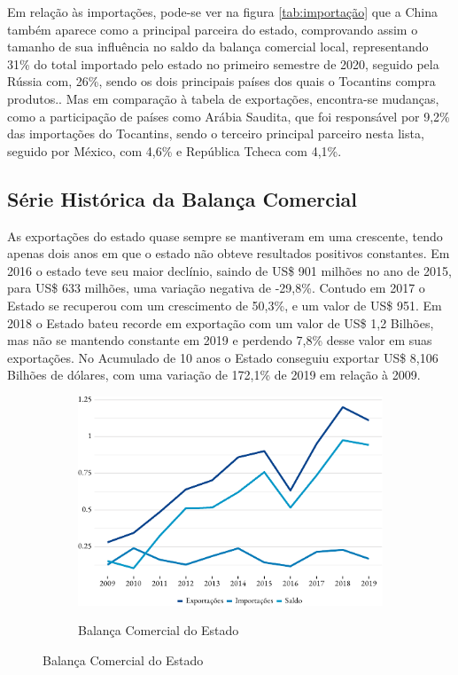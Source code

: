 \par Em relação às importações, pode-se ver na figura \ref{tab:importação} que a China também aparece como a principal parceira do estado, comprovando assim o tamanho de sua influência no saldo da balança comercial local, representando 31\% do total importado pelo estado no primeiro semestre de 2020, seguido pela Rússia com, 26\%, sendo os dois principais países dos quais o Tocantins compra produtos.. Mas em comparação à tabela de exportações, encontra-se mudanças, como a participação de países como Arábia Saudita, que foi responsável por 9,2\% das importações do Tocantins, sendo o terceiro principal parceiro nesta lista, seguido por México, com 4,6\% e República Tcheca com 4,1\%.


\subsection {Série Histórica da Balança Comercial}

\par As exportações do estado quase sempre se mantiveram em uma crescente, tendo
apenas dois anos em que o estado não obteve resultados positivos constantes. Em 2016 o estado teve seu maior declínio, saindo de US\$ 901 milhões no ano de 2015, para US\$ 633 milhões, uma variação negativa de  -29,8\%. 
Contudo em 2017 o Estado se recuperou com um crescimento de 50,3\%, e um valor de US\$ 951. Em 2018 o Estado bateu recorde em exportação com um valor de US\$ 1,2 Bilhões, mas não se mantendo constante em 2019 e perdendo 7,8\% desse valor em suas exportações.
No Acumulado de 10 anos o Estado conseguiu exportar US\$ 8,106 Bilhões de dólares, com uma variação de 172,1\% de 2019 em relação à 2009.

\begin{figure}[!h]
		\begin{subfigure}{\linewidth}
		\caption{Balança Comercial do Estado}
		\includegraphics{fig/total-1.pdf}
		\label{fig:balanca}
	\end{subfigure}
\end{figure}


